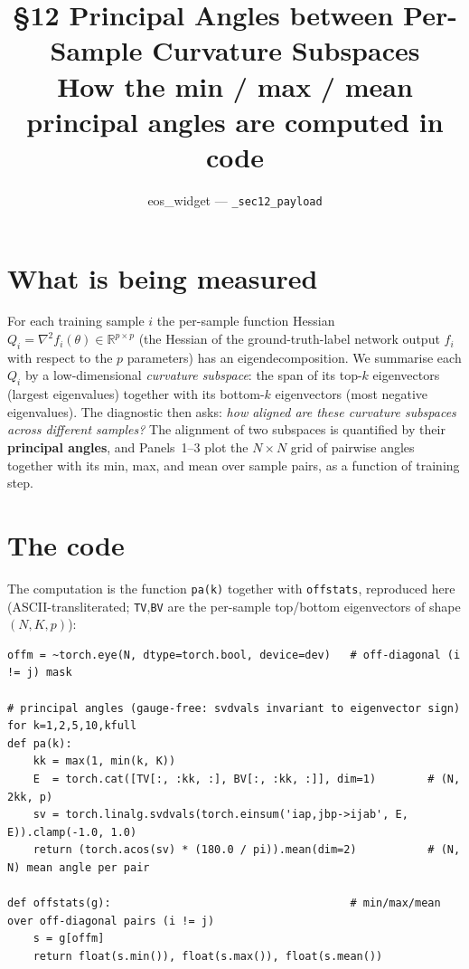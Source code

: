 \documentclass[11pt]{article}
\title{\S12 Principal Angles between Per-Sample Curvature Subspaces\\
\large How the min / max / mean principal angles are computed in code}
\author{eos\_widget --- \texttt{\_sec12\_payload}}
\date{}
\newcommand{\R}{\mathbb{R}}
\begin{document}
\maketitle

\section{What is being measured}

For each training sample $i$ the per-sample function Hessian
$Q_i=\nabla^2 f_i(\theta)\in\R^{p\times p}$ (the Hessian of the ground-truth-label
network output $f_i$ with respect to the $p$ parameters) has an eigendecomposition.
We summarise each $Q_i$ by a low-dimensional \emph{curvature subspace}: the span of
its top-$k$ eigenvectors (largest eigenvalues) together with its bottom-$k$
eigenvectors (most negative eigenvalues). The diagnostic then asks: \emph{how aligned
are these curvature subspaces across different samples?} The alignment of two
subspaces is quantified by their \textbf{principal angles}, and Panels~1--3 plot the
$N\times N$ grid of pairwise angles together with its min, max, and mean over sample
pairs, as a function of training step.

\section{The code}

The computation is the function \texttt{pa(k)} together with \texttt{offstats},
reproduced here (ASCII-transliterated; \texttt{TV},\texttt{BV} are the per-sample
top/bottom eigenvectors of shape $(N,K,p)$):

\begin{lstlisting}
offm = ~torch.eye(N, dtype=torch.bool, device=dev)   # off-diagonal (i != j) mask

# principal angles (gauge-free: svdvals invariant to eigenvector sign) for k=1,2,5,10,kfull
def pa(k):
    kk = max(1, min(k, K))
    E  = torch.cat([TV[:, :kk, :], BV[:, :kk, :]], dim=1)        # (N, 2kk, p)
    sv = torch.linalg.svdvals(torch.einsum('iap,jbp->ijab', E, E)).clamp(-1.0, 1.0)
    return (torch.acos(sv) * (180.0 / pi)).mean(dim=2)           # (N, N) mean angle per pair

def offstats(g):                                     # min/max/mean over off-diagonal pairs (i != j)
    s = g[offm]
    return float(s.min()), float(s.max()), float(s.mean())
\end{lstlisting}
\end{document}
